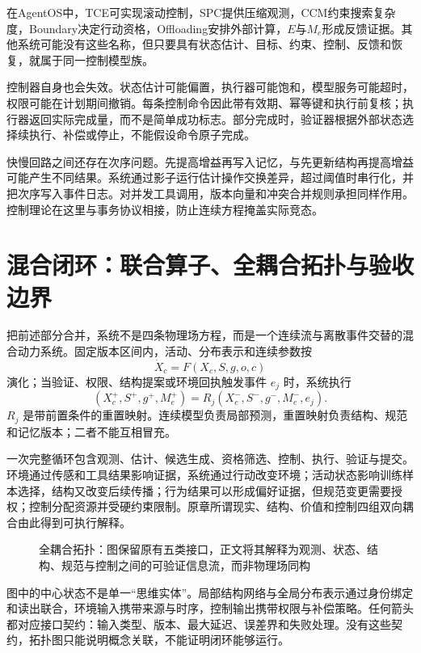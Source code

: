 在AgentOS中，TCE可实现滚动控制，SPC提供压缩观测，CCM约束搜索复杂度，Boundary决定行动资格，Offloading安排外部计算，$E$与$M_e$形成反馈证据。其他系统可能没有这些名称，但只要具有状态估计、目标、约束、控制、反馈和恢复，就属于同一控制模型族。

控制器自身也会失效。状态估计可能偏置，执行器可能饱和，模型服务可能超时，权限可能在计划期间撤销。每条控制命令因此带有效期、幂等键和执行前复核；执行器返回实际完成量，而不是简单成功标志。部分完成时，验证器根据外部状态选择续执行、补偿或停止，不能假设命令原子完成。

快慢回路之间还存在次序问题。先提高增益再写入记忆，与先更新结构再提高增益可能产生不同结果。系统通过影子运行估计操作交换差异，超过阈值时串行化，并把次序写入事件日志。对并发工具调用，版本向量和冲突合并规则承担同样作用。控制理论在这里与事务协议相接，防止连续方程掩盖实际竞态。

\section{混合闭环：联合算子、全耦合拓扑与验收边界}
\label{sec:section_7908}

把前述部分合并，系统不是四条物理场方程，而是一个连续流与离散事件交替的混合动力系统。固定版本区间内，活动、分布表示和连续参数按
\begin{equation}
\dot X_c=F(X_c,S,g,o,c)
\end{equation}
演化；当验证、权限、结构提案或环境回执触发事件 $e_j$ 时，系统执行
\begin{equation}
(X_c^+,S^+,g^+,M_e^+)=R_j(X_c^-,S^-,g^-,M_e^-,e_j).
\end{equation}
$R_j$ 是带前置条件的重置映射。连续模型负责局部预测，重置映射负责结构、规范和记忆版本；二者不能互相冒充。

一次完整循环包含观测、估计、候选生成、资格筛选、控制、执行、验证与提交。环境通过传感和工具结果影响证据，系统通过行动改变环境；活动状态影响训练样本选择，结构又改变后续传播；行为结果可以形成偏好证据，但规范变更需要授权；控制分配资源并受硬约束限制。原章所谓现实、结构、价值和控制四组双向耦合由此得到可执行解释。

\begin{figure}[htbp]
    \centering
    \resizebox{0.8\textwidth}{!}{}
    \caption{全耦合拓扑：图保留原有五类接口，正文将其解释为观测、状态、结构、规范与控制之间的可验证信息流，而非物理场同构}
\end{figure}

图中的中心状态不是单一“思维实体”。局部结构网络与全局分布表示通过身份绑定和读出联合，环境输入携带来源与时序，控制输出携带权限与补偿策略。任何箭头都对应接口契约：输入类型、版本、最大延迟、误差界和失败处理。没有这些契约，拓扑图只能说明概念关联，不能证明闭环能够运行。

